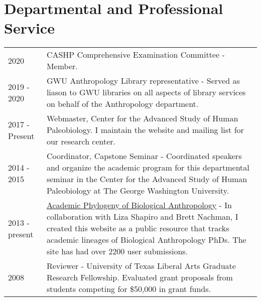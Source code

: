 \documentclass{article}
\begin{document}
\section*{Departmental and Professional Service}
\begin{longtable}{p{}p{}}
2020 & CASHP Comprehensive Examination Committee - Member.\\[4pt]
2019 - 2020 & GWU Anthropology Library representative - Served as liason to GWU libraries on all aspects of library services on behalf of the Anthropology department.\\[4pt]
2017 - Present & Webmaster, Center for the Advanced Study of Human Paleobiology. I maintain the website and mailing list for our research center.\\[4pt]
2014 - 2015 & Coordinator, Capstone Seminar - Coordinated speakers and organize the academic program for this departmental seminar in the Center for the Advanced Study of Human Paleobiology at The George Washington University. \\[4pt]
2013 - present &  \href{https://bioanthtree.org}{Academic Phylogeny of Biological Anthropology} - In collaboration with Liza Shapiro and Brett Nachman, I created this website as a public resource that tracks academic lineages of Biological Anthropology PhDs. The site has had over 2200 user submissions.\\[4pt]

 2008 & Reviewer - University of Texas Liberal Arts Graduate Research Fellowship. Evaluated grant proposals from students competing for \$50,000 in grant funds.\\
\end{longtable}
\end{document}
